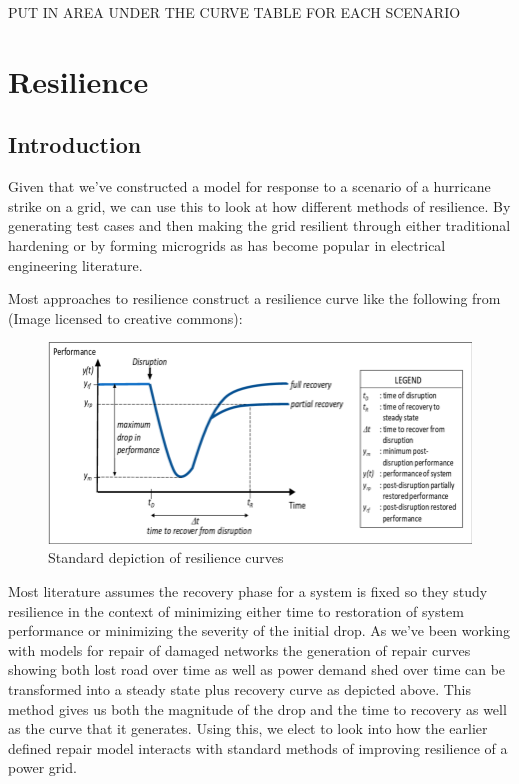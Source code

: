\documentclass{article}
\begin{document}
	PUT IN AREA UNDER THE CURVE TABLE FOR EACH SCENARIO
	\section{Resilience}
	\subsection{Introduction}
	Given that we've constructed a model for response to a scenario of a hurricane strike on a grid, we can use this to look at how different methods of resilience. By generating test cases and then making the grid resilient through either traditional hardening or by forming microgrids as has become popular in electrical engineering literature. 
	
	Most approaches to resilience construct a resilience curve like the following from \cite{Madni2020} (Image licensed to creative commons):
	
	\begin{figure}[htbp]
	\centering
	\includegraphics[width=.9\linewidth]{resiliencecurve.png}
	\caption{Standard depiction of resilience curves}
	\end{figure}
	
	Most literature assumes the recovery phase for a system is fixed so they study resilience in the context of minimizing either time to restoration of system performance or minimizing the severity of the initial drop. As we've been working with models for repair of damaged networks the generation of repair curves showing both lost road over time as well as power demand shed over time can be transformed into a steady state plus recovery curve as depicted above. This method gives us both the magnitude of the drop and the time to recovery as well as the curve that it generates. Using this, we elect to look into how the earlier defined repair model interacts with standard methods of improving resilience of a power grid.
	
\end{document}
